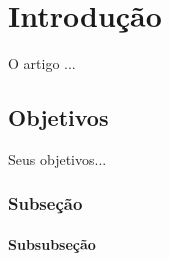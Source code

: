 \OnehalfSpacing
\chapter{Introdução}

O artigo \cite{Wang2013} ...

\section{Objetivos}

Seus objetivos...


\subsection{Subseção}

\lipsum[3-56]

\subsubsection{Subsubseção}

\lipsum[3-56]


\lipsum[3-56]




    



